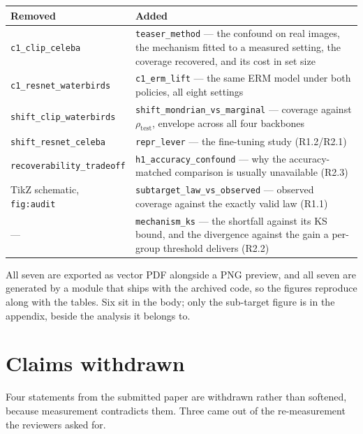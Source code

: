 \documentclass[11pt,a4paper]{article}
\newcommand{\was}[1]{\textcolor{cutred}{#1}}
\newcommand{\now}[1]{\textcolor{addblue}{#1}}
\begin{document}
\begin{center}
\begin{tabular}{@{}L{6.4cm}L{8.2cm}@{}}
\toprule
\textbf{Removed} & \textbf{Added} \\
\midrule
\was{\texttt{c1\_clip\_celeba}} & \now{\texttt{teaser\_method} --- the confound on real images, the
mechanism fitted to a measured setting, the coverage recovered, and its cost in set size} \\
\addlinespace
\was{\texttt{c1\_resnet\_waterbirds}} & \now{\texttt{c1\_erm\_lift} --- the same ERM model under
both policies, all eight settings} \\
\addlinespace
\was{\texttt{shift\_clip\_waterbirds}} & \now{\texttt{shift\_mondrian\_vs\_marginal} --- coverage
against $\rho_{\mathrm{test}}$, envelope across all four backbones} \\
\addlinespace
\was{\texttt{shift\_resnet\_celeba}} & \now{\texttt{repr\_lever} --- the fine-tuning study
(R1.2/R2.1)} \\
\addlinespace
\was{\texttt{recoverability\_tradeoff}} & \now{\texttt{h1\_accuracy\_confound} --- why the
accuracy-matched comparison is usually unavailable (R2.3)} \\
\addlinespace
\was{TikZ schematic, \texttt{fig:audit}} & \now{\texttt{subtarget\_law\_vs\_observed} --- observed
coverage against the exactly valid law (R1.1)} \\
\addlinespace
\was{---} & \now{\texttt{mechanism\_ks} --- the shortfall against its KS bound, and the divergence
against the gain a per-group threshold delivers (R2.2)} \\
\bottomrule
\end{tabular}
\end{center}

All seven are exported as vector PDF alongside a PNG preview, and all seven are generated by
a module that ships with the archived code, so the figures reproduce along with the tables. Six sit
in the body; only the sub-target figure is in the appendix, beside the analysis it belongs to.

\section{Claims withdrawn}
\label{sec:withdrawn}

Four statements from the submitted paper are withdrawn rather than softened, because measurement
contradicts them. Three came out of the re-measurement the reviewers asked for.
\end{document}
